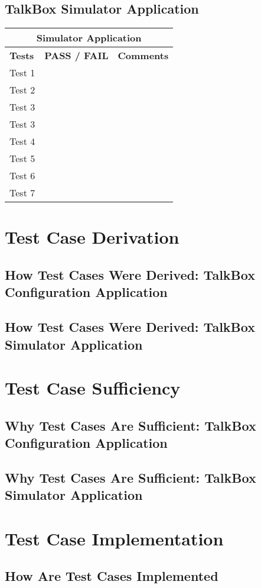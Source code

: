 \section{TalkBox Simulator Application}

\setlength{\arrayrulewidth}{0.3mm}
\setlength{\tabcolsep}{18pt}
\renewcommand{\arraystretch}{3.5}
 
\begin{tabular}{ |p{5cm}|p{1.5cm}|p{5cm}|  }
\hline
\multicolumn{3}{|c|}{\textbf{Simulator Application}} \\
\hline
\textbf{Tests} & \textbf{PASS / FAIL} & \textbf{Comments} \\
\hline
Test 1 &  & \\
\hline
Test 2 &    &  \\
\hline
Test 3 & &  \\
\hline
Test 3    & &  \\
\hline
Test 4 &  &  \\
\hline
Test 5 &  &    \\
\hline
Test 6 &  &   \\
\hline
Test 7 & & \\
\hline
\end{tabular}
\chapter{Test Case Derivation}
\label{System Features}

\section{How Test Cases Were Derived: TalkBox Configuration Application}
\section{How Test Cases Were Derived: TalkBox Simulator Application}

\chapter{Test Case Sufficiency}
\label{Other Nonfunctional Requirements}

\section{Why Test Cases Are Sufficient: TalkBox Configuration Application}
\section{Why Test Cases Are Sufficient: TalkBox Simulator Application}

\chapter{Test Case Implementation}
\label{Other Requirements}
\section{How Are Test Cases Implemented}




